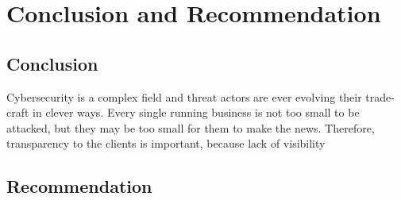 \chapter{Conclusion and Recommendation}
\section{Conclusion}
Cybersecurity is a complex field and threat actors are ever evolving their trade-craft in clever ways. Every single
running business is not too small to be attacked, but they may be too small for them to make the news. Therefore, transparency
to the clients is important, because lack of visibility
\section{Recommendation}